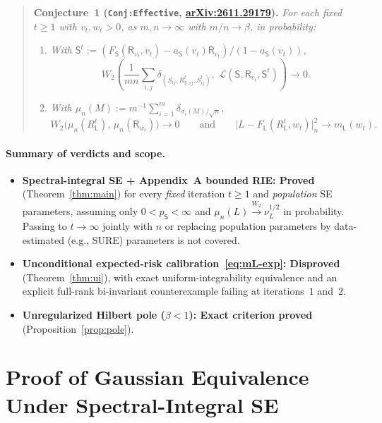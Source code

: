 \documentclass[11pt]{article}
\theoremstyle{plain}
\theoremstyle{definition}
\theoremstyle{remark}
\newcommand{\sL}{\mathsf{L}}
\newcommand{\sS}{\mathsf{S}}
\newcommand{\sR}{\mathsf{R}}
\begin{document}
\begin{quote}
\textbf{Conjecture~1 (\texttt{Conj:Effective}, \href{https://arxiv.org/abs/2611.29179}{arXiv:2611.29179}).}
\emph{For each fixed $t \ge 1$ with $v_t, w_t > 0$, as $m, n \to \infty$ with $m/n \to \beta$, in probability:}
\begin{enumerate}[label=\textup{(\roman*)}]
\item \emph{With $\sS^t := (F_{\sS}(\sR_{v_t}, v_t) - a_{\sS}(v_t)\sR_{v_t})/(1 - a_{\sS}(v_t))$,}
\[
W_2\!\left(\frac{1}{mn}\sum_{i,j}\delta_{(S_{ij}, R_{\sS,ij}^t, S_{ij}^t)},\;
\mathcal{L}(\sS, \sR_{v_t}, \sS^t)\right) \to 0.
\]
\item \emph{With $\mu_n(M) := m^{-1}\sum_{i=1}^m \delta_{\sigma_i(M)/\sqrt{n}}$,}
\[
W_2\bigl(\mu_n(R_{\sL}^t),\,\mu_n(\bm{\sR}_{w_t})\bigr) \to 0
\qquad\text{and}\qquad
\bigl|L - F_{\sL}(R_{\sL}^t, w_t)\bigr|_n^2 \to m_{\sL}(w_t).
\]
\end{enumerate}
\end{quote}

\paragraph{Summary of verdicts and scope.}
\begin{itemize}[leftmargin=2em,itemsep=2pt]
\item \textbf{Spectral-integral SE + Appendix~A bounded RIE: Proved} (Theorem~\ref{thm:main}) for every \emph{fixed} iteration $t \ge 1$ and \emph{population} SE parameters, assuming only $0 < p_{\sS} < \infty$ and $\mu_n(L) \xrightarrow{W_2} \nu_L^{1/2}$ in probability. Passing to $t \to \infty$ jointly with $n$ or replacing population parameters by data-estimated (e.g., SURE) parameters is not covered.
\item \textbf{Unconditional expected-risk calibration~\eqref{eq:mL-exp}: Disproved} (Theorem~\ref{thm:ui}), with exact uniform-integrability equivalence and an explicit full-rank bi-invariant counterexample failing at iterations~$1$ and~$2$.
\item \textbf{Unregularized Hilbert pole ($\beta < 1$): Exact criterion proved} (Proposition~\ref{prop:pole}).
\end{itemize}

\section{Proof of Gaussian Equivalence Under Spectral-Integral SE}\label{sec:proof}
\end{document}
